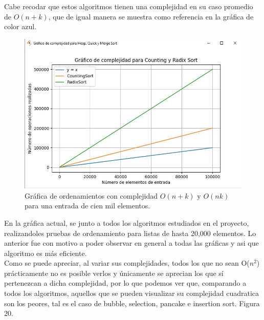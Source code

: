 \documentclass[a4paper,12pt]{article}
\begin{document}
Cabe recodar que estos algoritmos tienen una complejidad en su caso promedio de $O(n+k)$, que de igual manera se muestra como referencia en la gráfica de color azul.  

\begin{figure}[h]
    \centering
    \includegraphics[width=1\textwidth]{media/graficaC_100k.jpg}
    \caption{Gráfica de ordenamientos con complejidad $O(n+k)$ y $O(nk)$ para una entrada de cien mil elementos.}
    \label{fig:grafC_100k}
\end{figure}

En la gráfica actual, se junto a todos los algoritmos estudiados en el proyecto, realizandoles pruebas de ordenamiento para listas de hasta 20,000 elementos. Lo anterior fue con motivo a poder observar en general a todas las gráficas y asi que algoritmo es más eficiente.\\

Como se puede apreciar, al variar sus complejidades, todos los que no sean O($n^2$) prácticamente no es posible verlos y únicamente se aprecian los que sí pertenezcan a dicha complejidad, por lo que podemos ver que, comparando a todos los algoritmos, aquellos que se pueden visualizar su complejidad cuadratica son los peores, tal es el caso de bubble, selection, pancake e insertion sort. Figura 20.
\end{document}
